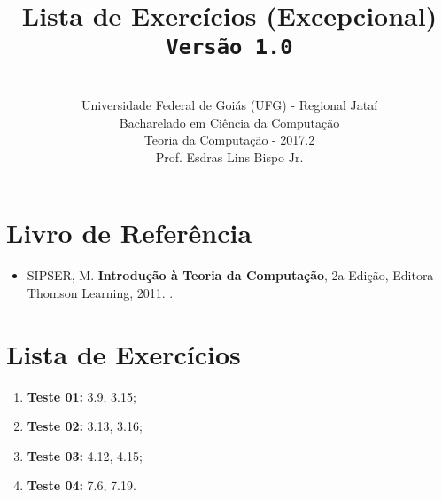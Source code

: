 \documentclass[12pt,a4paper,oneside]{article}
\author{\\Universidade Federal de Goiás (UFG) - Regional Jataí\\Bacharelado em Ciência da Computação \\Teoria da Computação - 2017.2 \\Prof. Esdras Lins Bispo Jr.}
\date{}
\title{
	\sc \huge Lista de Exercícios (Excepcional)
	\\{\tt Versão 1.0}
}
\begin{document}
\maketitle

\section{Livro de Referência}
	\begin{itemize}
		\item SIPSER, M. {\bf Introdução à Teoria da Computação}, 2a Edição, Editora Thomson Learning, 2011. \color{blue}{\bf Código Bib.: [004 SIP/int]}.
	\end{itemize}
	
\section{Lista de Exercícios}

\begin{enumerate}
	\item[] {\bf Teste 01:} 3.9, 3.15;
	\item[] {\bf Teste 02:} 3.13, 3.16;
	\item[] {\bf Teste 03:} 4.12, 4.15;
	\item[] {\bf Teste 04:} 7.6, 7.19.
	
\end{enumerate}
\end{document}
